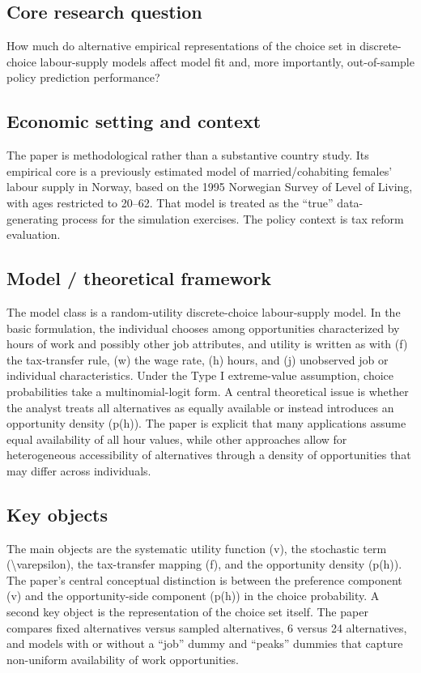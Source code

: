 \documentclass[11pt,a4paper]{article}
\begin{document}
\subsection*{Core research question}
How much do alternative empirical representations of the choice set in discrete-choice labour-supply models affect model fit and, more importantly, out-of-sample policy prediction performance?

\subsection*{Economic setting and context}
The paper is methodological rather than a substantive country study. Its empirical core is a previously estimated model of married/cohabiting females’ labour supply in Norway, based on the 1995 Norwegian Survey of Level of Living, with ages restricted to 20–62. That model is treated as the “true” data-generating process for the simulation exercises. The policy context is tax reform evaluation.

\subsection*{Model / theoretical framework}
The model class is a random-utility discrete-choice labour-supply model. In the basic formulation, the individual chooses among opportunities characterized by hours of work and possibly other job attributes, and utility is written as with (f) the tax-transfer rule, (w) the wage rate, (h) hours, and (j) unobserved job or individual characteristics. Under the Type I extreme-value assumption, choice probabilities take a multinomial-logit form. A central theoretical issue is whether the analyst treats all alternatives as equally available or instead introduces an opportunity density (p(h)). The paper is explicit that many applications assume equal availability of all hour values, while other approaches allow for heterogeneous accessibility of alternatives through a density of opportunities that may differ across individuals.

\subsection*{Key objects}
The main objects are the systematic utility function (v), the stochastic term (\textbackslash{}varepsilon), the tax-transfer mapping (f), and the opportunity density (p(h)). The paper’s central conceptual distinction is between the preference component (v) and the opportunity-side component (p(h)) in the choice probability. A second key object is the representation of the choice set itself. The paper compares fixed alternatives versus sampled alternatives, 6 versus 24 alternatives, and models with or without a “job” dummy and “peaks” dummies that capture non-uniform availability of work opportunities.
\end{document}
